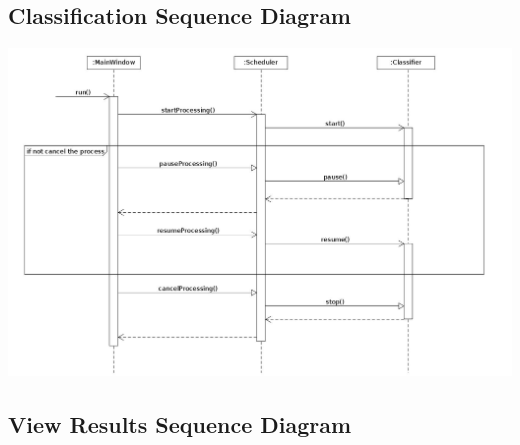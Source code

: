 \documentclass[parskip=full]{scrartcl}
\begin{document}
\pagebreak

\subsection {Classification Sequence Diagram}

\begin{center}
\includegraphics[width=1.0\textwidth]{Classification.jpg}
\end{center}

\pagebreak

\subsection {View Results Sequence Diagram}
\end{document}
